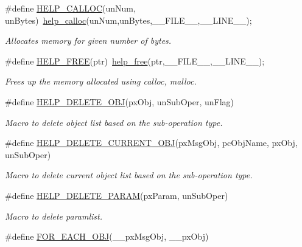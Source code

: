 \begin{DoxyCompactItemize}
\#define \hyperlink{group__LIBHELP_ga4a9270ad9715e300750c7ff40fca0f47}{H\-E\-L\-P\-\_\-\-C\-A\-L\-L\-O\-C}(un\-Num, un\-Bytes)~\hyperlink{group__LIBHELP_gad69e4cc1b0997b751beff9531e3b858b}{help\-\_\-calloc}(un\-Num,un\-Bytes,\-\_\-\-\_\-\-F\-I\-L\-E\-\_\-\-\_\-,\-\_\-\-\_\-\-L\-I\-N\-E\-\_\-\-\_\-);
\begin{DoxyCompactList}\small\item\em Allocates memory for given number of bytes. \end{DoxyCompactList}\item 
\#define \hyperlink{group__LIBHELP_gad8118b0746b34f72d8b9a150290716e5}{H\-E\-L\-P\-\_\-\-F\-R\-E\-E}(ptr)~\hyperlink{group__LIBHELP_ga119da297e15f5e43ef6d6ed4aabddd41}{help\-\_\-free}(ptr,\-\_\-\-\_\-\-F\-I\-L\-E\-\_\-\-\_\-,\-\_\-\-\_\-\-L\-I\-N\-E\-\_\-\-\_\-);
\begin{DoxyCompactList}\small\item\em Frees up the memory allocated using calloc, malloc. \end{DoxyCompactList}\item 
\#define \hyperlink{group__LIBHELP_gaba577ed1b62fe6cde726c52c728db28c}{H\-E\-L\-P\-\_\-\-D\-E\-L\-E\-T\-E\-\_\-\-O\-B\-J}(px\-Obj, un\-Sub\-Oper, un\-Flag)
\begin{DoxyCompactList}\small\item\em Macro to delete object list based on the sub-\/operation type. \end{DoxyCompactList}\item 
\#define \hyperlink{group__LIBHELP_ga99910227eb7d3018295e593c2dae6c6d}{H\-E\-L\-P\-\_\-\-D\-E\-L\-E\-T\-E\-\_\-\-C\-U\-R\-R\-E\-N\-T\-\_\-\-O\-B\-J}(px\-Msg\-Obj, pc\-Obj\-Name, px\-Obj, un\-Sub\-Oper)
\begin{DoxyCompactList}\small\item\em Macro to delete current object list based on the sub-\/operation type. \end{DoxyCompactList}\item 
\#define \hyperlink{group__LIBHELP_gae56c82c0991fd4f80c6895c584ebcda0}{H\-E\-L\-P\-\_\-\-D\-E\-L\-E\-T\-E\-\_\-\-P\-A\-R\-A\-M}(px\-Param, un\-Sub\-Oper)
\begin{DoxyCompactList}\small\item\em Macro to delete paramlist. \end{DoxyCompactList}\item 
\#define \hyperlink{group__LIBHELP_ga44bea3fdb184428ac979556cba1459af}{F\-O\-R\-\_\-\-E\-A\-C\-H\-\_\-\-O\-B\-J}(\-\_\-\-\_\-px\-Msg\-Obj, \-\_\-\-\_\-px\-Obj)

\end{DoxyCompactItemize}
